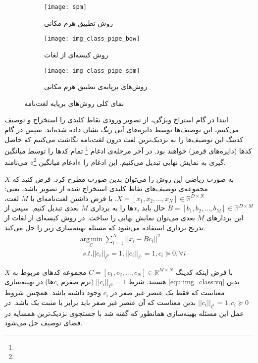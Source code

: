 \documentclass[11pt]{article}
\begin{document}
\begin{figure}[t]
	\centering
	\begin{subfigure}[h]{0.7\textwidth}
		\centering
		\texttt{[image: spm]}
		\caption{روش تطبیق هرم مکانی}
		\label{fig:img_class:pipe:spm}
	\end{subfigure}
	\begin{subfigure}[h]{0.3\textwidth}
		\centering
		\texttt{[image: img\_class\_pipe\_bow]}
		\caption{روش کیسه‌ای از لغات}
		\label{fig:img_class:pipe:bow}
	\end{subfigure}
	\begin{subfigure}[h]{0.3\textwidth}
		\centering
		\texttt{[image: img\_class\_pipe\_spm]}
		\caption{روش‌های برپایه‌ی تطبیق هرم مکانی}
		\label{fig:img_class:pipe:gen}
	\end{subfigure}
	\caption{نمای کلی روش‌های برپایه لغت‌نامه}
	\label{fig:img_class:pipe}
\end{figure}
ابتدا در گام استراخ ویژگی، از تصویر ورودی نقاط کلیدی را استخراج و توصیف می‌کنیم، این توصیف‌ها توسط دایره‌های آبی رنگ نشان داده شده‌اند. سپس در گام کدینگ این توصیف‌ها را به نزدیک‌ترین لغت درون لغت‌نامه نگاشت می‌کنیم که حاصل کدها (دایره‌های قرمز) خواهند بود. در آخر مرحله‌ی ادغام
\footnote{}
تمام کدها را توسط میانگین گیری به نمایش نهایی تبدیل می‌کنیم. این ادغام را «ادغام میانگین
\footnote{}» می‌نامند.

به صورت ریاضی این روش را می‌توان بدین صورت مطرح کرد. فرض کنید که $X$ مجموعه‌ی توصیف‌های نقاط کلیدی استخراج شده از تصویر باشد، یعنی:
$X = [x_1, x_2, ..., x_N] \in \mathbb{R}^{D \times N}$.
با فرض داشتن لغت‌نامه‌ای با $M$ لغت،
$B = [b_1, b_2, ..., b_M] \in \mathbb{R}^{D \times M}$
حال باید $x_i$ها را به برداری $M$ بعدی تبدیل کنیم. سپس از این بردارهای $M$ بعدی می‌توان نمایش نهایی را ساخت.
در روش کیسه‌ای از لغات از تدریج برداری استفاده می‌شود که مسئله بهینه‌سازی زیر را حل می‌کند.
\begin{equation}
	\begin{aligned}
		&\operatorname*{arg\,min}_C \sum_{i=1}^{N} || x_i - B c_i ||^2 \\
		&{\,\,\,\,} \textit{s.t.} || c_i ||_{\ell^0} = 1, || c_i ||_{\ell^1} = 1, c_i \succeq 0, \forall i
	\end{aligned}
\label{equ:img_class:vq}
\end{equation}

با فرض اینکه کدینگ
$C = [c_1, c_2, ..., c_N] \in \mathbb{R}^{M \times N}$
مجموعه کد‌های مربوط به $X$ هستند.
شرط
$|| c_i ||_{\ell^0} = 1$
(نرم صفرم $c_i$ها) در بهینه‌سازی
\ref{equ:img_class:vq}
بدین معناست که فقط یک عنصر غیر صفر در $c_i$ وجود داشته باشد. همچنین شروط
$|| c_i ||_{\ell^1} = 1, c_i \succeq 0$
بدین معناست که آن عنصر غیر صفر باید برابر با مثبت یک باشد. در عمل این مسئله بهینه‌سازی همانطور که گفته شد با جستجوی نزدیک‌ترین همسایه در فضای توصیف حل می‌شود.
\end{document}

